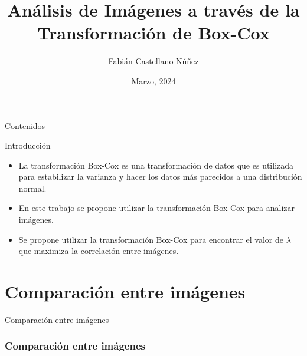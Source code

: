 \documentclass{beamer}
\title[Defensa de Memoria]{\bf An\'alisis de Im\'agenes a trav\'es de la Transformaci\'on de Box-Cox}
\author{Fabián Castellano Núñez}
\institute[Universidad Técnica Federico Santa María]
  {
  Profesor Guia: Ronny Vallejos A.
  }
\date{Marzo,  2024}
\begin{document}
\begin{frame}
  \titlepage
\end{frame}

\begin{frame}{Contenidos}
  \tableofcontents
\end{frame}


\begin{frame}{Introducción}
    \begin{center}
        \begin{itemize}
            \item La transformación Box-Cox es una transformación de datos que es utilizada para estabilizar la varianza y hacer los datos más parecidos a una distribución normal.
            \item En este trabajo se propone utilizar la transformación Box-Cox para analizar imágenes.
            \item Se propone utilizar la transformación Box-Cox para encontrar el valor de $\lambda$ que maximiza la correlación entre imágenes.
        \end{itemize}
    \end{center}
\end{frame}



\section{Comparación entre imágenes}
\begin{frame}{Comparación entre imágenes}
\frametitle{Comparación entre imágenes}
\end{frame}
\end{document}
